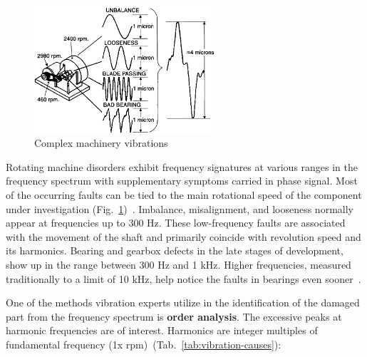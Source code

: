 \begin{figure}[ht]
	\centering
	\includegraphics[width=0.6\textwidth]{assets/analysis/complex-vibrations.png}
	\caption{Complex machinery vibrations~\cite{davies_handbook_2012}}
	\label{fig:machinery-vibrations}
\end{figure}

Rotating machine disorders exhibit frequency signatures at various ranges in the frequency spectrum with supplementary symptoms carried in phase signal. Most of the occurring faults can be tied to the main rotational speed of the component under investigation (Fig.~\ref{fig:machinery-vibrations})~\cite{davies_handbook_2012}. Imbalance, misalignment, and looseness normally appear at frequencies up to 300 Hz. These low-frequency faults are associated with the movement of the shaft and primarily coincide with revolution speed and its harmonics. Bearing and gearbox defects in the late stages of development, show up in the range between 300 Hz and 1 kHz. Higher frequencies, measured traditionally to a limit of 10 kHz, help notice the faults in bearings even sooner~\cite{torres_automatic_2022}.

One of the methods vibration experts utilize in the identification of the damaged part from the frequency spectrum is \textbf{order analysis}. The excessive peaks at harmonic frequencies are of interest. Harmonics are integer multiples of fundamental frequency (1x rpm)~(Tab.~\ref{tab:vibration-causes}):

